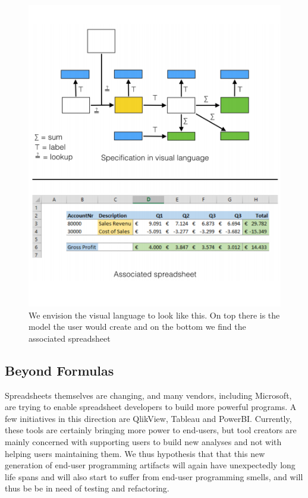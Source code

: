 \documentclass[conference]{IEEEtran}
\begin{document}
\begin{figure}
  \begin{center}
  \includegraphics[width=\columnwidth]{fig/visualLanguage.png}
  \caption{We envision the visual language to look like this. On top there is the model the user would create and on the bottom we find the associated spreadsheet}
  \label{fig:visualLanguage}
  \end{center}
\end{figure} 


\subsection{Beyond Formulas}
Spreadsheets themselves are changing, and many vendors, including Microsoft, are trying to enable spreadsheet developers to build more powerful programs. A few initiatives in this direction are QlikView, Tableau and PowerBI. Currently, these tools are certainly bringing more power to end-users, but tool creators are mainly concerned with supporting users to build new analyses and not with helping users maintaining them. We thus hypothesis that that this new generation of end-user programming artifacts will again have unexpectedly long life spans and will also start to suffer from end-user programming smells, and will thus be be in need of testing and refactoring.
\end{document}
